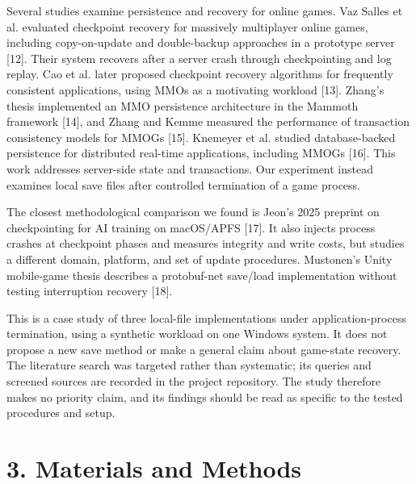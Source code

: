 \documentclass{jepcs}
\begin{document}
Several studies examine persistence and recovery for online games. Vaz Salles et al. evaluated checkpoint recovery for massively multiplayer online games, including copy-on-update and double-backup approaches in a prototype server [12]. Their system recovers after a server crash through checkpointing and log replay. Cao et al. later proposed checkpoint recovery algorithms for frequently consistent applications, using MMOs as a motivating workload [13]. Zhang's thesis implemented an MMO persistence architecture in the Mammoth framework [14], and Zhang and Kemme measured the performance of transaction consistency models for MMOGs [15]. Knemeyer et al. studied database-backed persistence for distributed real-time applications, including MMOGs [16]. This work addresses server-side state and transactions. Our experiment instead examines local save files after controlled termination of a game process.

The closest methodological comparison we found is Jeon's 2025 preprint on checkpointing for AI training on macOS/APFS [17]. It also injects process crashes at checkpoint phases and measures integrity and write costs, but studies a different domain, platform, and set of update procedures. Mustonen's Unity mobile-game thesis describes a protobuf-net save/load implementation without testing interruption recovery [18].

This is a case study of three local-file implementations under application-process termination, using a synthetic workload on one Windows system. It does not propose a new save method or make a general claim about game-state recovery. The literature search was targeted rather than systematic; its queries and screened sources are recorded in the project repository. The study therefore makes no priority claim, and its findings should be read as specific to the tested procedures and setup.

\section{3. Materials and Methods}
\end{document}

